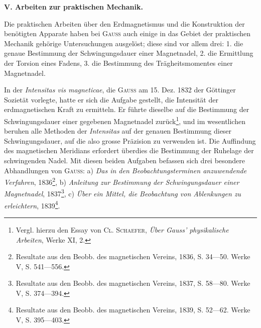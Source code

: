 \clearpage\begingroup{}
\makeatletter\tagsleft@true\let\veqno\@@leqno\makeatother
\renewcommand{\thefootnote}{\arabic{footnote})}\setcounter{footnote}{102}
\begin{center}\textbf{V. Arbeiten zur praktischen Mechanik.}\end{center}
\noindent\hspace*{\parindent}Die praktischen Arbeiten über den Erdmagnetismus und die Konstruktion
der benötigten Apparate haben bei \textsc{Gauss} auch einige in das Gebiet der
praktischen Mechanik gehörige Untersuchungen ausgelöst; diese sind vor allem
drei: 1. die genaue Bestimmung der Schwingungsdauer einer Magnetnadel,
2. die Ermittlung der Torsion eines Fadens, 3. die Bestimmung des Trägheitsmomentes
einer Magnetnadel.

\begin{center}\end{center}
\noindent\hspace*{\parindent}In der \textit{Intensitas vis magneticae}, die \textsc{Gauss} am 15. Dez. 1832 der Göttinger
Sozietät vorlegte, hatte er sich die Aufgabe gestellt, die Intensität der
erdmagnetischen Kraft zu ermitteln. Er führte dieselbe auf die Bestimmung
der Schwingungsdauer einer gegebenen Magnetnadel zurück\footnote{Vergl. hierzu den Essay von \textsc{Cl. Schaefer}, \textit{Über Gauss’ physikalische Arbeiten}, Werke XI, 2.}, und im wesentlichen
beruhen alle Methoden der \textit{Intensitas} auf der genauen Bestimmung
dieser Schwingungsdauer, auf die also grosse Präzision zu verwenden ist. Die
Auffindung des magnetischen Meridians erfordert überdies die Bestimmung
der Ruhelage der schwingenden Nadel. Mit diesen beiden Aufgaben befassen
sich drei besondere Abhandlungen von \textsc{Gauss}: a) \textit{Das in den Beobachtungsterminen
anzuwendende Verfahren}, 1836\footnote{Resultate aus den Beobb. des magnetischen Vereins, 1836, S. 34—50. Werke V, S. 541—556.}, b) \textit{Anleitung zur Bestimmung der
Schwingungsdauer einer Magnetnadel}, 1837\footnote{Resultate aus den Beobb. des magnetischen Vereins, 1837, S. 58—80. Werke V, S. 374—394.}, c) \textit{Über ein Mittel, die Beobachtung
von Ablenkungen zu erleichtern}, 1839\footnote{Resultate aus den Beobb. des magnetischen Vereins, 1839, S. 52—62. Werke V, S. 395—403.}.
\clearpage{}

